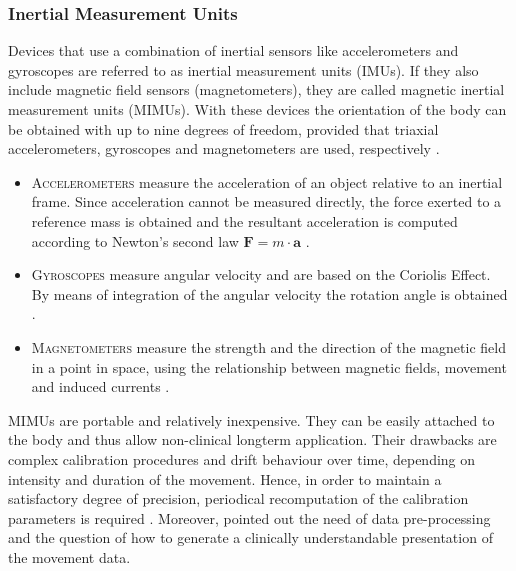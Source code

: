 \subsubsection{Inertial Measurement Units} Devices that use a combination of inertial sensors like accelerometers and gyroscopes are referred to as inertial measurement units (IMUs). If they also include magnetic field sensors (magnetometers), they are called magnetic inertial measurement units (MIMUs). With these devices the orientation of the body can be obtained with up to nine degrees of freedom, provided that triaxial accelerometers, gyroscopes and magnetometers are used, respectively \cite{olivares_vicente_signal_2013}.

\begin{itemize}

\item \textsc{Accelerometers} measure the acceleration of an object relative to an inertial frame. Since acceleration cannot be measured directly, the force exerted to a reference mass is obtained and the resultant acceleration is computed according to Newton's second law $ \mathbf{F} = m \cdot \mathbf a $ \cite{encyclopedia_britannica_accelerometer_2014}.

\item \textsc{Gyroscopes} measure angular velocity and are based on the Coriolis Effect. By means of integration of the angular velocity the rotation angle is obtained \cite{olivares_vicente_signal_2013}.

\item \textsc{Magnetometers} measure the strength and the direction of the magnetic field in a point in space, using the relationship between magnetic fields, movement and induced currents \cite{olivares_vicente_signal_2013}.
 
\end{itemize}
MIMUs are portable and relatively inexpensive. They can be easily attached to the body and thus allow non-clinical longterm application. Their drawbacks are complex calibration procedures and drift behaviour over time, depending on intensity and duration of the movement. Hence, in order to maintain a satisfactory degree of precision, periodical recomputation of the calibration parameters is required \cite{olivares_vicente_signal_2013}. Moreover, \citeauthor{mancini_isway:_2012} \cite{mancini_isway:_2012} pointed out the need of data pre-processing and the question of how to generate a clinically understandable presentation of the movement data.

